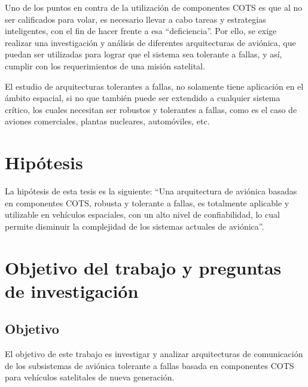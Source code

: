Uno de los puntos en contra de la utilización de componentes \ac{COTS} es que al no ser calificados para 
volar, es necesario llevar a cabo tareas y estrategias inteligentes, con el fin de hacer frente a 
esa “deficiencia”. Por ello, se exige realizar una investigación y análisis de diferentes 
arquitecturas de aviónica, que puedan ser utilizadas para lograr que el sistema sea tolerante a 
fallas, y así, cumplir con los requerimientos de una misión satelital. 

El estudio de arquitecturas tolerantes a fallas, no solamente tiene aplicación en el ámbito 
espacial, si no que también puede ser extendido a cualquier sistema crítico, los cuales necesitan 
ser robustos y tolerantes a fallas, como es el caso de aviones comerciales, plantas nucleares, 
automóviles, etc.

\section{Hipótesis}
La hipótesis de esta tesis es la siguiente: ``Una arquitectura de aviónica  basadas en componentes 
\ac{COTS}, robusta y tolerante a fallas, es totalmente aplicable y utilizable en vehículos espaciales, 
con un alto nivel de confiabilidad, lo cual permite disminuir la complejidad de los sistemas actuales de aviónica''.

\section{Objetivo del trabajo y preguntas de investigación}

\subsection{Objetivo}
El objetivo de este trabajo es investigar y analizar arquitecturas de comunicación de los 
subsistemas de aviónica tolerante a fallas basada en componentes \ac{COTS} para vehículos 
satelitales de nueva generación.

